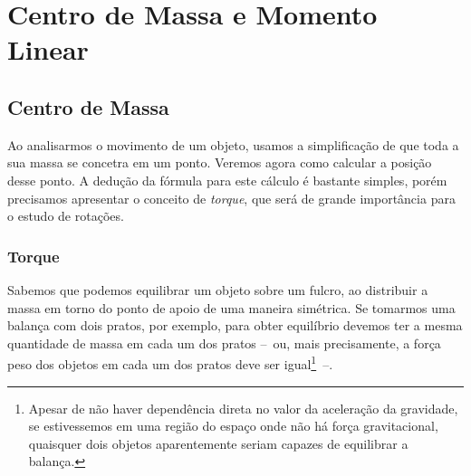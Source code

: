 \chapter{Centro de Massa e Momento Linear}
\label{Chap:CentroDeMassaEMomentoLinear}


\section{Centro de Massa}

Ao analisarmos o movimento de um objeto, usamos a simplificação de que toda a sua massa se concetra em um ponto. Veremos agora como calcular a posição desse ponto. A dedução da fórmula para este cálculo é bastante simples, porém precisamos apresentar o conceito de \emph{torque}, que será de grande importância para o estudo de rotações.

\subsection{Torque}

Sabemos que podemos equilibrar um objeto sobre um fulcro, ao distribuir a massa em torno do ponto de apoio de uma maneira simétrica. Se tomarmos uma balança com dois pratos, por exemplo, para obter equilíbrio devemos ter a mesma quantidade de massa em cada um dos pratos --~ou, mais precisamente, a força peso dos objetos em cada um dos pratos deve ser igual\footnote{Apesar de não haver dependência direta no valor da aceleração da gravidade, se estivessemos em uma região do espaço onde não há força gravitacional, quaisquer dois objetos aparentemente seriam capazes de equilibrar a balança.}~--. 

